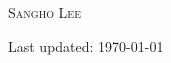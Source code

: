 \documentclass[10pt,letterpaper]{article}
\def\name{\textsc{Sangho Lee}}
\begin{document}
{\Huge \name}


\vspace{0.15in}


% 









% 

% 
% 


\begin{center}
  \begin{small}
    Last updated: \today
  \end{small}
\end{center}
\end{document}
